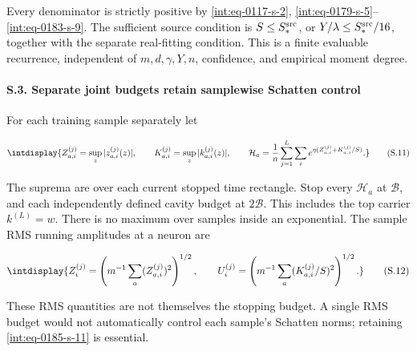 
Every denominator is strictly positive by \eqref{int:eq-0117-s-2}, \eqref{int:eq-0179-s-5}--\allowbreak \eqref{int:eq-0183-s-9}. The sufficient source condition is \(S\le S_*^{\rm src}\), or \(Y/\lambda\le S_*^{\rm src}/16\), together with the separate real-fitting condition. This is a finite evaluable recurrence, independent of \(m,\allowbreak d,\allowbreak \gamma,\allowbreak Y,\allowbreak n\), confidence, and empirical moment degree.


\paragraph{S.3. Separate joint budgets retain samplewise Schatten control}

\mbox{}\par\smallskip


For each training sample separately let


\begingroup\renewcommand{\theHequation}{intdisplay.376}
\begin{equation}
\intdisplay{
Z_{a,i}^{(j)}=\sup_z|z_{a,i}^{(j)}(z)|,\qquad
K_{a,i}^{(j)}=\sup_z|k_{a,i}^{(j)}(z)|,
\qquad
\mathcal H_a=\frac1n\sum_{j=1}^L\sum_i
 e^{\eta(Z_{a,i}^{(j)}+K_{a,i}^{(j)}/S)}.
}
\tag{S.11}
\label{int:eq-0185-s-11}
\end{equation}
\endgroup


The suprema are over each current stopped time rectangle. Stop every \(\mathcal H_a\) at \(\mathcal B\), and each independently defined cavity budget at \(2\mathcal B\). This includes the top carrier \(k^{(L)}=w\). There is no maximum over samples inside an exponential. The sample RMS running amplitudes at a neuron are


\begingroup\renewcommand{\theHequation}{intdisplay.377}
\begin{equation}
\intdisplay{
Z_i^{(j)}=\left(m^{-1}\sum_a(Z_{a,i}^{(j)})^2\right)^{1/2},
\qquad U_i^{(j)}=\left(m^{-1}\sum_a(K_{a,i}^{(j)}/S)^2\right)^{1/2}.
}
\tag{S.12}
\label{int:eq-0186-s-12}
\end{equation}
\endgroup


These RMS quantities are not themselves the stopping budget. A single RMS budget would not automatically control each sample's Schatten norms; retaining \eqref{int:eq-0185-s-11} is essential.


